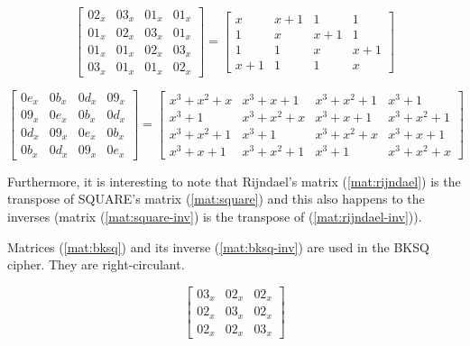 \begin{equation}\label{mat:rijndael}
\begin{bmatrix}
02_x & 03_x & 01_x & 01_x\\
01_x & 02_x & 03_x & 01_x\\
01_x & 01_x & 02_x & 03_x\\
03_x & 01_x & 01_x & 02_x
\end{bmatrix}
=
\begin{bmatrix}
x & x+1 & 1 & 1\\
1 & x & x+1 & 1\\
1 & 1 & x & x+1\\
x+1 & 1 & 1 & x
\end{bmatrix}
\end{equation}

\begin{equation}\label{mat:rijndael-inv}
\begin{bmatrix}
0e_x & 0b_x & 0d_x & 09_x\\
09_x & 0e_x & 0b_x & 0d_x\\
0d_x & 09_x & 0e_x & 0b_x\\
0b_x & 0d_x & 09_x & 0e_x
\end{bmatrix}
=
\begin{bmatrix}
x^3+x^2+x & x^3+x+1 & x^3+x^2+1 & x^3+1\\
x^3+1 & x^3+x^2+x & x^3+x+1 & x^3+x^2+1\\
x^3+x^2+1 & x^3+1 & x^3+x^2+x & x^3+x+1\\
x^3+x+1 & x^3+x^2+1 & x^3+1 & x^3+x^2+x
\end{bmatrix}
\end{equation}

Furthermore, it is interesting to note that Rijndael's matrix (\ref{mat:rijndael}) is the transpose of SQUARE's matrix (\ref{mat:square}) and this also happens to the inverses (matrix (\ref{mat:square-inv}) is the transpose of (\ref{mat:rijndael-inv})).

Matrices (\ref{mat:bksq}) and its inverse (\ref{mat:bksq-inv}) are used in the BKSQ \cite{BKSQ1998} cipher. They are right-circulant.

\begin{equation}\label{mat:bksq}
\begin{bmatrix}
03_x & 02_x & 02_x\\
02_x & 03_x & 02_x\\
02_x & 02_x & 03_x
\end{bmatrix}
\end{equation}

